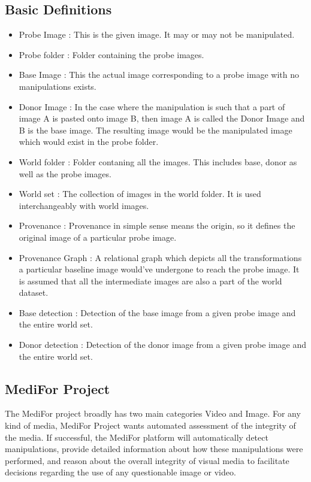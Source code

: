 \documentclass{article}
\begin{document}
\subsection{Basic Definitions}
\begin{itemize}
\item Probe Image : This is the given image. It may or may not be manipulated.
\item Probe folder : Folder containing the probe images.
\item Base Image : This the actual image corresponding to a probe image with no manipulations exists.
\item Donor Image : In the case where the manipulation is such that a part of image A is pasted onto image B, then image A is called the Donor Image and B is the base image. The resulting image would be the manipulated image which would exist in the probe folder.
\item World folder : Folder contaning all the images. This includes base, donor as well as the probe images.
\item World set : The collection of images in the world folder. It is used interchangeably with world images.
\item Provenance : Provenance in simple sense means the origin, so it defines the original image of a particular probe image.
\item Provenance Graph : A relational graph which depicts all the transformations a particular baseline image would've undergone to reach the probe image. It is assumed that all the intermediate images are also a part of the world dataset.
\item Base detection : Detection of the base image from a given probe image and the entire world set.
\item Donor detection : Detection of the donor image from a given probe image and the entire world set.
\end{itemize}

\subsection{MediFor Project}
The MediFor project broadly has two main categories Video and Image. For any kind of media, MediFor Project wants automated assessment of the integrity of the media. If successful, the MediFor platform will automatically detect manipulations, provide detailed information about how these manipulations were performed, and reason about the overall integrity of visual media to facilitate decisions regarding the use of any questionable image or video.\cite{MedF_w}
\end{document}
